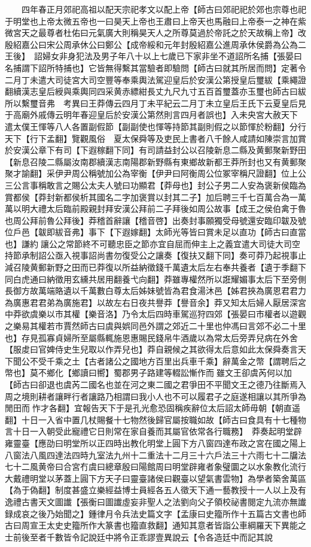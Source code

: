 　　四年春正月郊祀高祖以配天宗祀孝文以配上帝【師古曰郊祀祀於郊也宗尊也祀于明堂也上帝太微五帝也一曰昊天上帝也王肅曰上帝天也馬融曰上帝泰一之神在紫微宮天之最尊者杜佑曰元氣廣大則稱昊天人之所尊莫過於帝託之於天故稱上帝】改殷紹嘉公曰宋公周承休公曰鄭公【成帝綏和元年封殷紹嘉公進周承休侯爵為公為二王後】　詔婦女非身犯法及男子年八十以上七歲已下家非坐不道詔所名捕【張晏曰名捕謂下詔所特捕也】它皆無得繫其當驗者即驗問【師古曰就其所居而問】定著令　二月丁未遣大司徒宮大司空豐等奉乘輿法駕迎皇后於安漢公第授皇后璽紱【乘繩證翻續漢志皇后綬與乘輿同四采黄赤縹紺長丈九尺九寸五百首璽蓋亦玉璽也師古曰紱所以繫璽音弗　考異曰王莽傳云四月丁未平紀云二月丁未立皇后王氏下云夏皇后見于高廟外戚傳云明年春迎皇后於安漢公第然則言四月者誤也】入未央宮大赦天下　遣太僕王惲等八人各置副假節【副副使也惲等持節其副則假之以節惲於粉翻】分行天下【行下孟翻】覽觀風俗　夏太保舜等及吏民上書者八千餘人咸請如陳崇言加賞於安漢公章下有司【下遐稼翻下同】有司請益封公以召陵新息二縣及黄郵聚新野田【新息召陵二縣屬汝南郡續漢志南陽郡新野縣有東鄉故新都王莽所封也又有黄郵聚聚才諭翻】采伊尹周公稱號加公為宰衡【伊尹曰阿衡周公位冢宰稱尺證翻】位上公三公言事稱敢言之賜公太夫人號曰功顯君【莽母也】封公子男二人安為褒新侯臨為賞都侯【莽封新都侯析其國名二字加褒賞以封其二子】加后聘三千七百萬合為一萬萬以明大禮太后臨前殿親封拜安漢公拜前二子拜後如周公故事【成王之侯伯禽于魯也周公拜前魯公拜後】莽稽首辭讓【稽音啓】出奏封事願獨受母號還安臨印韍及號位戶邑【韍即紱音弗】事下【下遐嫁翻】太師光等皆曰賞未足以直功【師古曰直當也】謙約讓公之常節終不可聽忠臣之節亦宜自屈而伸主上之義宜遣大司徒大司空持節承制詔公亟入視事詔尚書勿復受公之讓奏【復扶又翻下同】奏可莽乃起視事止減召陵黄郵新野之田而已莽復以所益納徵錢千萬遺太后左右奉共養者【遺于季翻下同白虎通曰納徵用玄纁共居用翻養弋向翻】莽雖專權然所以誑耀媚事太后下至旁側長御方故萬端賂遺以千萬數白尊太后姊妹號皆為君食湯沐邑【姊君挾為廣恩君君力為廣惠君君弟為廣施君】以故左右日夜共譽莽【譽音余】莽又知太后婦人厭居深宮中莽欲虞樂以市其權【樂音洛】乃令太后四時車駕巡狩四郊【張晏曰市權者以遊觀之樂易其權若市賈然師古曰虞與娯同邑外謂之郊近二十里也仲馮曰言郊不必二十里也】存見孤寡貞婦所至屬縣輒施恩惠賜民錢帛牛酒歲以為常太后旁弄兒病在外舍【服䖍曰官婢侍史生兒取以作弄兒也】莽自親候之其欲得太后意如此太保舜奏言天下聞公不受千乘之土【古者諸公之國地方百里出兵車千乘】辭萬金之幣【謂聘后之幣也】莫不鄉化【鄉讀曰嚮】蜀郡男子路建等輟訟慚作而雖文王卻虞芮何以加【師古曰卻退也虞芮二國名也並在河之東二國之君爭田不平聞文王之德乃往斷焉入周之境則耕者讓畔行者讓路乃相謂曰我小人也不可以履君子之庭遂相讓以其所爭為閒田而怍才各翻】宜報告天下于是孔光愈恐固稱疾辭位太后詔太師毋朝【朝直遥翻】十日一入省中置几杖賜餐十七物然後歸官屬按職如故【師古曰食具有十七種物言十日一入朝受此寵禮它日則常在家自養而其屬官依常各行職務】　莽奏起明堂辟雍靈臺【應劭曰明堂所以正四時出教化明堂上圓下方八窗四達布政之宮在國之陽上八窗法八風四達法四時九室法九州十二重法十二月三十六戶法三十六雨七十二牖法七十二風黄帝曰合宮冇虞曰總章殷曰陽館周曰明堂辟雍者象璧圜之以水象教化流行大戴禮明堂以茅蓋上圓下方天子曰靈臺諸侯曰觀臺以望氣書雲物】為學者築舍萬區【為于偽翻】制度甚盛立樂經益博士員經各五人徵天下通一藝教授十一人以上及有逸禮古書天文圖䜟【張衡曰圖䜟虛妄非聖人之法劉向父子領校祕書閱定九流亦無䜟録成哀之後乃始聞之】鍾律月令兵法史篇文字【孟康曰史籀所作十五篇古文書也師古曰周宣王太史史籀所作大篆書也籀直救翻】通知其意者皆詣公車綱羅天下異能之士前後至者千數皆令記說廷中將令正乖謬壹異說云【令各造廷中而記其說
